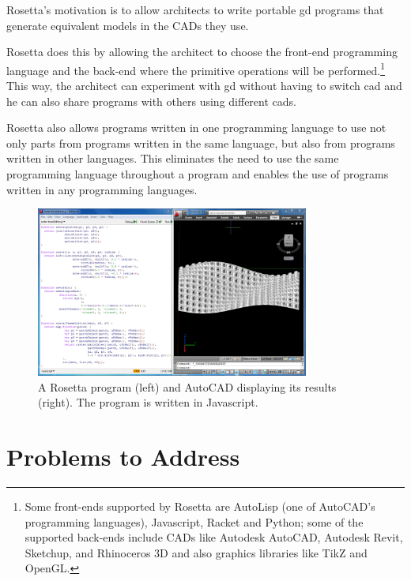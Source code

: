 Rosetta's motivation is to allow architects to write portable \gls{gd} programs that generate equivalent models in the CADs they use.

Rosetta does this by allowing the architect to choose the front-end programming language and the back-end where the primitive operations will be performed.\footnote{Some front-ends supported by Rosetta are AutoLisp (one of AutoCAD's programming languages), Javascript, Racket and Python; some of the supported back-ends include CADs like Autodesk AutoCAD, Autodesk Revit, Sketchup, and Rhinoceros 3D and also graphics libraries like TikZ and OpenGL.}
This way, the architect can experiment with \gls{gd} without having to switch \gls{cad} and he can also share programs with others using different \glspl{cad}.

Rosetta also allows programs written in one programming language to use not only parts from programs written in the same language, but also from programs written in other languages.
This eliminates the need to use the same programming language throughout a program and enables the use of programs written in any programming languages.

\begin{figure}
	\centering
	\includegraphics[width=0.8\textwidth]{images/rosetta_js_autocad}
	\caption{A Rosetta program (left) and AutoCAD displaying its results (right). The program is written in Javascript.}
	\label{fig:rosetta:ex}
\end{figure}


\section{Problems to Address}
